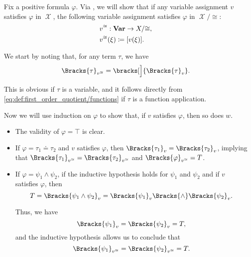 \begin{defproof}
  Fix a positive formula \( \varphi \). Via , we will show that if any variable assignment \( v \) satisfies \( \varphi \) in \( \mscrX \), the following variable assignment satisfies \( \varphi \) in \( \mscrX / {\cong} \):
  \begin{equation*}
    \begin{aligned}
      &v^{\cong}: \operatorname{\mathbf{Var}} \to X / {\cong}, \\
      &v^{\cong}(\xi) \coloneqq [v(\xi)].
    \end{aligned}
  \end{equation*}

  We start by noting that, for any term \( \tau \), we have
  \begin{equation}\label{eq:thm:quotient_preserves_positive_formulas/term_equality}
    \Bracks{\tau}_{v^{\cong}} = \bracks[\Big]{ \Bracks{\tau}_v }.
  \end{equation}

  This is obvious if \( \tau \) is a variable, and it follows directly from \eqref{eq:def:first_order_quotient/functions} if \( \tau \) is a function application.

  Now we will use induction on \( \varphi \) to show that, if \( v \) satisfies \( \varphi \), then so does \( w \).
  \begin{itemize}
    \item The validity of \( \varphi = \top \) is clear.
    \item If \( \varphi = \tau_1 \doteq \tau_2 \) and \( v \) satisfies \( \varphi \), then \( \Bracks{\tau_1}_v = \Bracks{\tau_2}_v \), implying that \( \Bracks{\tau_1}_{v^{\cong}} = \Bracks{\tau_2}_{v^{\cong}} \) and \( \Bracks{\varphi}_{v^{\cong}} = T \).

    \item If \( \varphi = \psi_1 \wedge \psi_2 \), if the inductive hypothesis holds for \( \psi_1 \) and \( \psi_2 \) and if \( v \) satisfies \( \varphi \), then
    \begin{equation*}
      T
      =
      \Bracks{\psi_1 \wedge \psi_2}_v
      =
      \Bracks{\psi_1}_v \Bracks{\wedge} \Bracks{\psi_2}_v.
    \end{equation*}

    Thus, we have
    \begin{equation*}
      \Bracks{\psi_1}_v = \Bracks{\psi_2}_v = T,
    \end{equation*}
    and the inductive hypothesis allows us to conclude that
    \begin{equation*}
      \Bracks{\psi_1}_{v^{\cong}} = \Bracks{\psi_2}_{v^{\cong}} = T.
    \end{equation*}


\end{itemize}
\end{defproof}
